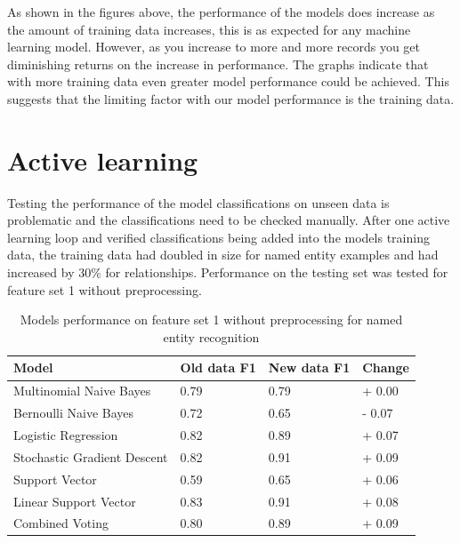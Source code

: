 \documentclass[11pt,oneside]{book}
\begin{document}
As shown in the figures above, the performance of the models does increase as the amount of training data increases, this is as expected for any machine learning model. However, as you increase to more and more records you get diminishing returns on the increase in performance. The graphs indicate that with more training data even greater model performance could be achieved. This suggests that the limiting factor with our model performance is the training data.

\section{Active learning}
Testing the performance of the model classifications on unseen data is problematic and the classifications need to be checked manually. After one active learning loop and verified classifications being added into the models training data, the training data had doubled in size for named entity examples and had increased by 30\% for relationships. Performance on the testing set was tested for feature set 1 without preprocessing.

\begin{longtable}[c]{|l|l|l|l|}
\caption{Models performance on feature set 1 without preprocessing for named entity recognition}
\label{tab:new_ner_feature_set_5}\\
\hline
\textbf{Model} & \textbf{Old data F1} & \textbf{New data F1} & \textbf{Change} \\ \hline
\endfirsthead
%
\endhead
%
Multinomial Naive Bayes & 0.79 & 0.79 & + 0.00 \\ \hline
Bernoulli Naive Bayes & 0.72 & 0.65 & - 0.07 \\ \hline
Logistic Regression & 0.82 & 0.89 & + 0.07 \\ \hline
Stochastic Gradient Descent & 0.82 & 0.91 & + 0.09 \\ \hline
Support Vector & 0.59 & 0.65 & + 0.06 \\ \hline
Linear Support Vector & 0.83 & 0.91 & + 0.08 \\ \hline
Combined Voting & 0.80 & 0.89 & + 0.09 \\ \hline
\end{longtable}
\end{document}

